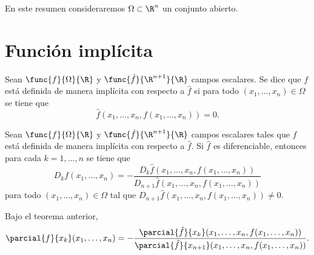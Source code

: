 \documentclass[a4,11pt]{aleph-notas}
\begin{document}
\encabezado

En este resumen consideraremos $\Omega\subset\R^n$ un conjunto abierto.

\section{Función implícita}

\begin{defi}
    Sean $\func{f}{\Omega}{\R}$ y $\func{\hat{f}}{\R^{n+1}}{\R}$ campos escalares. Se dice que $f$ está definida de manera implícita con respecto a $\hat{f}$ si para todo $(x_1,\ldots,x_n)\in \Omega$ se tiene que
    \[
        \hat{f}(x_1,\ldots,x_n,f(x_1,\ldots,x_n))=0.
    \]
\end{defi}

\begin{teo}
    Sean $\func{f}{\Omega}{\R}$ y $\func{\hat{f}}{\R^{n+1}}{\R}$ campos escalares tales que $f$ está definida de manera implícita con respecto a $\hat{f}$. Si $\hat{f}$ es diferenciable, entonces para cada $k=1,\ldots, n$ se tiene que
    \[
        D_k f(x_1,\ldots,x_n) =
        -\frac{D_k \hat{f}(x_1,\ldots,x_n,f(x_1,\ldots,x_n))}{D_{n+1} \hat{f}(x_1,\ldots,x_n,f(x_1,\ldots,x_n))}
    \]
    para todo $(x_1,\ldots,x_n)\in \Omega$ tal que $D_{n+1} \hat{f}(x_1,\ldots,x_n,f(x_1,\ldots,x_n))\neq 0$.
\end{teo}

\begin{advertencia}
    Bajo el teorema anterior,
    \[
        \parcial{f}{x_k}(x_1,\ldots,x_n)=
        -\frac{\parcial{\hat{f}}{x_k}(x_1,\ldots,x_n,f(x_1,\ldots,x_n))}
              {\parcial{\hat{f}}{x_{n+1}}(x_1,\ldots,x_n,f(x_1,\ldots,x_n))}.
    \]
\end{advertencia}
\end{document}
